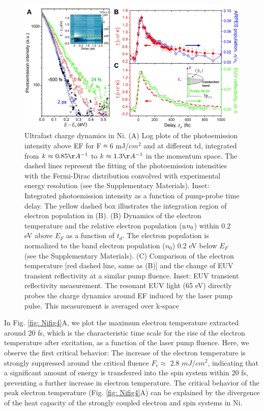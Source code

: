 \begin{figure}[htbp]
	\begin{center}
		\includegraphics[width=150mm]{aap9744_Figure_fig3_seq3_v1.pdf}
	\end{center}
	\caption{Ultrafast charge dynamics in Ni. (A) Log plots of the photoemission intensity above EF for F ≈ 6 mJ/c$m^2$ and at different td, integrated from $k_{\/\/} \approx 0.85 \AA^{-1}$ to $k_{\/\/} \approx 1.3 \AA^{-1}$ in the momentum space. The dashed lines represent the fitting of the photoemission intensities with the Fermi-Dirac distribution convolved with experimental energy resolution (see the Supplementary Materials). Inset: Integrated photoemission intensity as a function of pump-probe time delay. The yellow dashed box illustrates the integration region of electron population in (B). (B) Dynamics of the electron temperature and the relative electron population (n$\/n_{0}$) within 0.2 eV above $E_{F}$ as a function of $t_d$. The electron population is normalized to the band electron population ($n_{0}$) 0.2 eV below $E_{F}$ (see the Supplementary Materials). (C) Comparison of the electron temperature [red dashed line, same as (B)] and the change of EUV transient reflectivity at a similar pump fluence. Inset: EUV transient reflectivity measurement. The resonant EUV light (65 eV) directly probes the charge dynamics around EF induced by the laser pump pulse. This measurement is averaged over k-space}
	\label{fig: Nifig3}
\end{figure}

In Fig. \ref{fig: Nifig4}A, we plot the maximum electron temperature extracted around 20 fs, which is the characteristic time scale for the rise of the electron temperature after excitation, as a function of the laser pump fluence. Here, we observe the first critical behavior: The increase of the electron temperature is strongly suppressed around the critical fluence $F_{c} \approx$ 2.8 $mJ/cm^2$, indicating that a significant amount of energy is transferred into the spin system within 20 fs, preventing a further increase in electron temperature. The critical behavior of the peak electron temperature (Fig. \ref{fig: Nifig4}A) can be explained by the divergence of the heat capacity of the strongly coupled electron and spin systems in Ni.

